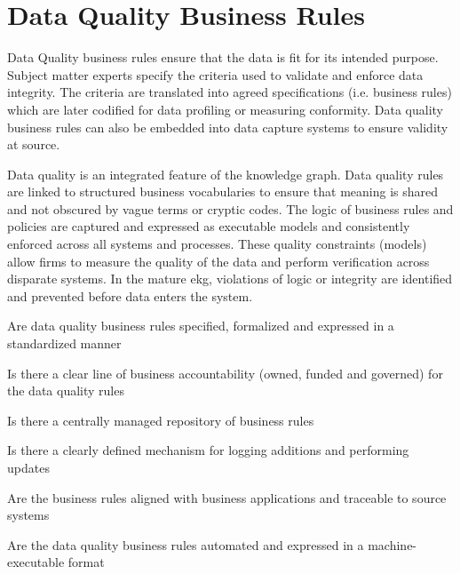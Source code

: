 \section{Data Quality Business Rules}\label{sec:ekgmm-b-3-2} %

Data Quality business rules ensure that the data is fit for its intended purpose.
Subject matter experts specify the criteria used to validate and enforce data integrity.
The criteria are translated into agreed specifications (i.e. business rules) which are later codified for
data profiling or measuring conformity.
Data quality business rules can also be embedded into data capture systems to ensure validity at source.

\ekgmmContextSection

Data quality is an integrated feature of the knowledge graph.
Data quality rules are linked to structured business vocabularies to ensure that meaning
is shared and not obscured by vague terms or cryptic codes.
The logic of business rules and policies are captured and expressed as executable models and consistently
enforced across all systems and processes.
These quality constraints (models) allow firms to measure the quality of the data and perform verification across
disparate systems.
In the mature \gls{ekg}, violations of logic or integrity are identified and prevented before data
enters the system.

\kgmmcorequestionssection

\begin{core-questions}

  \item [\thesection.1] Are data quality business rules specified, formalized and expressed in a standardized manner
  \item [\thesection.2] Is there a clear line of business accountability (owned, funded and governed) for the
                        data quality rules
  \item [\thesection.3] Is there a centrally managed repository of business rules
  \item [\thesection.4] Is there a clearly defined mechanism for logging additions and performing updates
  \item [\thesection.5] Are the business rules aligned with business applications and traceable to source systems
  \item [\thesection.6] Are the data quality business rules automated and expressed in a machine-executable format

\end{core-questions}

